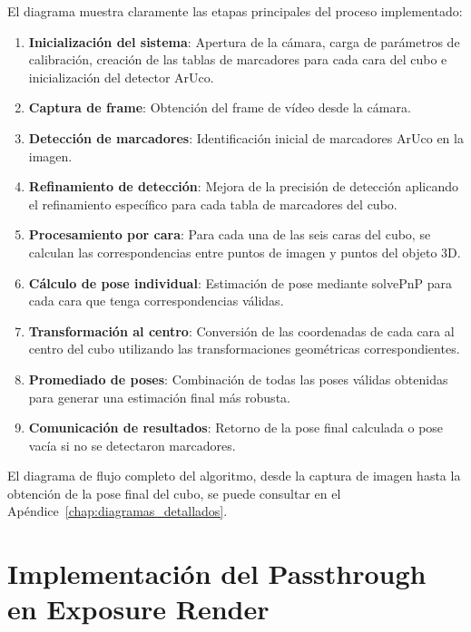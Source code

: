 El diagrama muestra claramente las etapas principales del proceso implementado:
\begin{enumerate}
    \item \textbf{Inicialización del sistema}: Apertura de la cámara, carga de parámetros de calibración, creación de las tablas de marcadores para cada cara del cubo e inicialización del detector ArUco.
    \item \textbf{Captura de frame}: Obtención del frame de vídeo desde la cámara.
    \item \textbf{Detección de marcadores}: Identificación inicial de marcadores ArUco en la imagen.
    \item \textbf{Refinamiento de detección}: Mejora de la precisión de detección aplicando el refinamiento específico para cada tabla de marcadores del cubo.
    \item \textbf{Procesamiento por cara}: Para cada una de las seis caras del cubo, se calculan las correspondencias entre puntos de imagen y puntos del objeto 3D.
    \item \textbf{Cálculo de pose individual}: Estimación de pose mediante solvePnP para cada cara que tenga correspondencias válidas.
    \item \textbf{Transformación al centro}: Conversión de las coordenadas de cada cara al centro del cubo utilizando las transformaciones geométricas correspondientes.
    \item \textbf{Promediado de poses}: Combinación de todas las poses válidas obtenidas para generar una estimación final más robusta.
    \item \textbf{Comunicación de resultados}: Retorno de la pose final calculada o pose vacía si no se detectaron marcadores.
\end{enumerate}

El diagrama de flujo completo del algoritmo, desde la captura de imagen hasta la obtención de la pose final del cubo, se puede consultar en el Apéndice~\ref{chap:diagramas_detallados}.

\section{Implementación del Passthrough en Exposure Render}
